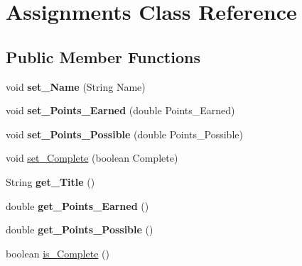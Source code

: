 \hypertarget{class_assignments}{\section{Assignments Class Reference}
\label{class_assignments}
}
\subsection*{Public Member Functions}
\begin{DoxyCompactItemize}
\item 
\hypertarget{class_assignments_a546a739ef608acb62c428d7444aac85a}{void {\bfseries set\-\_\-\-Name} (String Name)}\label{class_assignments_a546a739ef608acb62c428d7444aac85a}

\item 
\hypertarget{class_assignments_a1baff5e9a891fe85833a506e21991937}{void {\bfseries set\-\_\-\-Points\-\_\-\-Earned} (double Points\-\_\-\-Earned)}\label{class_assignments_a1baff5e9a891fe85833a506e21991937}

\item 
\hypertarget{class_assignments_a2683f11f4334bdd4986038ae8c999a01}{void {\bfseries set\-\_\-\-Points\-\_\-\-Possible} (double Points\-\_\-\-Possible)}\label{class_assignments_a2683f11f4334bdd4986038ae8c999a01}

\item 
void \hyperlink{class_assignments_a83f11e37fb45905476ac6de967df4d30}{set\-\_\-\-Complete} (boolean Complete)
\item 
\hypertarget{class_assignments_afbcab424668c27c8a2e5dfec599668a7}{String {\bfseries get\-\_\-\-Title} ()}\label{class_assignments_afbcab424668c27c8a2e5dfec599668a7}

\item 
\hypertarget{class_assignments_a8385c73c3474754d60dd70dc9f774014}{double {\bfseries get\-\_\-\-Points\-\_\-\-Earned} ()}\label{class_assignments_a8385c73c3474754d60dd70dc9f774014}

\item 
\hypertarget{class_assignments_a34b9c05e713e10ee25df746dc0046a6f}{double {\bfseries get\-\_\-\-Points\-\_\-\-Possible} ()}\label{class_assignments_a34b9c05e713e10ee25df746dc0046a6f}

\item 
boolean \hyperlink{class_assignments_adf873944a997bc3b1b24768047d6ace6}{is\-\_\-\-Complete} ()
\end{DoxyCompactItemize}


